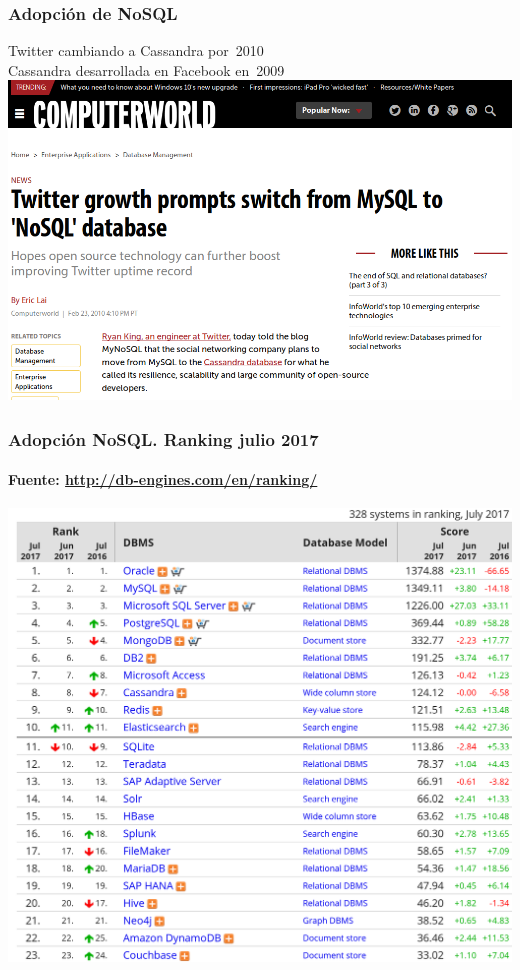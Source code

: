 \documentclass[14pt]{beamer}
\begin{document}


\begin{frame}
  \frametitle{Adopción de NoSQL}
Twitter cambiando a Cassandra por~2010\\
Cassandra desarrollada en Facebook en~2009\\
\includegraphics[width=\textwidth]{img/twitter-cassandra}
\end{frame}

\begin{frame}
  \frametitle{Adopción NoSQL. Ranking julio 2017}
\framesubtitle{Fuente: \url{http://db-engines.com/en/ranking/}}
\vspace*{.1ex}
\centering\includegraphics[width=.8\textwidth]{img/ranking-bbdd}
\end{frame}
\end{document}
